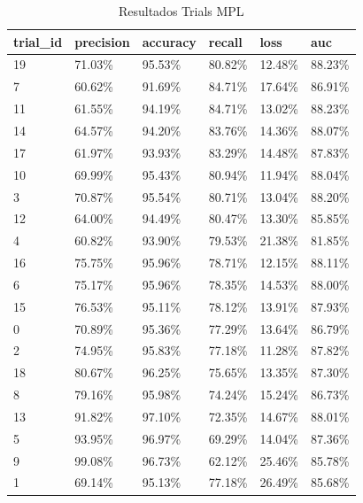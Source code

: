 \begin{table}[H]
    \centering
    \caption{Resultados Trials MPL}
    \label{tab:trials_mlp}
    \begin{tabular}{@{}llllll@{}}
        \toprule
        \textbf{trial\_id} & \textbf{precision} & \textbf{accuracy} & \textbf{recall} & \textbf{loss} & \textbf{auc} \\
        \midrule
        19 & 71.03\% & 95.53\% & 80.82\% & 12.48\% & 88.23\% \\
        7 & 60.62\% & 91.69\% & 84.71\% & 17.64\% & 86.91\% \\
        11 & 61.55\% & 94.19\% & 84.71\% & 13.02\% & 88.23\% \\
        14 & 64.57\% & 94.20\% & 83.76\% & 14.36\% & 88.07\% \\
        17 & 61.97\% & 93.93\% & 83.29\% & 14.48\% & 87.83\% \\
        10 & 69.99\% & 95.43\% & 80.94\% & 11.94\% & 88.04\% \\
        3 & 70.87\% & 95.54\% & 80.71\% & 13.04\% & 88.20\% \\
        12 & 64.00\% & 94.49\% & 80.47\% & 13.30\% & 85.85\% \\
        4 & 60.82\% & 93.90\% & 79.53\% & 21.38\% & 81.85\% \\
        16 & 75.75\% & 95.96\% & 78.71\% & 12.15\% & 88.11\% \\
        6 & 75.17\% & 95.96\% & 78.35\% & 14.53\% & 88.00\% \\
        15 & 76.53\% & 95.11\% & 78.12\% & 13.91\% & 87.93\% \\
        0 & 70.89\% & 95.36\% & 77.29\% & 13.64\% & 86.79\% \\
        2 & 74.95\% & 95.83\% & 77.18\% & 11.28\% & 87.82\% \\
        18 & 80.67\% & 96.25\% & 75.65\% & 13.35\% & 87.30\% \\
        8 & 79.16\% & 95.98\% & 74.24\% & 15.24\% & 86.73\% \\
        13 & 91.82\% & 97.10\% & 72.35\% & 14.67\% & 88.01\% \\
        5 & 93.95\% & 96.97\% & 69.29\% & 14.04\% & 87.36\% \\
        9 & 99.08\% & 96.73\% & 62.12\% & 25.46\% & 85.78\% \\
        1 & 69.14\% & 95.13\% & 77.18\% & 26.49\% & 85.68\% \\
        \bottomrule
    \end{tabular}
\end{table}

